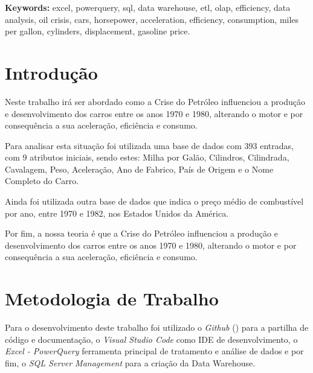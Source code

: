 \documentclass[a4paper]{article}
\begin{document}
\vspace{1cm}
\textbf{Keywords:} excel, powerquery, sql, data warehouse, etl, olap, efficiency, data analysis, oil crisis, cars,
horsepower, acceleration, efficiency, consumption, miles per gallon, cylinders, displacement, gasoline price.
\renewcommand{\contentsname}{Índice}       %
\renewcommand{\listfigurename}{Índice de Figuras} %

\newpage
\doublespacing
\tableofcontents
\listoffigures
\doublespacing

\newpage
{}

\section{Introdução}\label{intro}
Neste trabalho irá ser abordado como a Crise do Petróleo influenciou a produção e desenvolvimento
dos carros entre os anos 1970 e 1980, alterando o motor e por consequência a sua aceleração, eficiência e consumo.

Para analisar esta situação foi utilizada uma base de dados com 393 entradas, com 9 atributos iniciais, sendo estes:
 Milha por Galão, Cilindros, Cilindrada, Cavalagem, Peso, Aceleração, Ano de Fabrico, País de Origem e o Nome Completo do Carro.

Ainda foi utilizada outra base de dados que indica o preço médio de combustível por ano, entre 1970 e 1982, 
nos Estados Unidos da América.

Por fim, a nossa teoria é que a Crise do Petróleo influenciou a produção e 
desenvolvimento dos carros entre os anos 1970 e 1980, alterando o motor e por consequência a sua aceleração, eficiência e consumo.
\section{Metodologia de Trabalho}\label{met}
Para o desenvolvimento deste trabalho foi utilizado o \textit{Github} (\cite{github}) para a partilha de código e documentação,
o \textit{Visual Studio Code} como IDE de desenvolvimento, o \textit{Excel - PowerQuery} ferramenta principal de tratamento
e análise de dados e por fim, o \textit{SQL Server Management} para a criação da Data Warehouse. 
\end{document}
